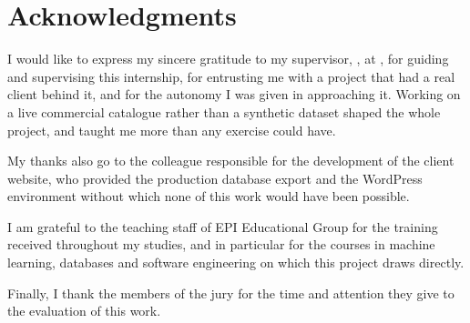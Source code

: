 \thispagestyle{plain}
{}
\chapter*{Acknowledgments}

I would like to express my sincere gratitude to my supervisor, \supervisor, at \companyname, for guiding and supervising this internship, for entrusting me with a project that had a real client behind it, and for the autonomy I was given in approaching it. Working on a live commercial catalogue rather than a synthetic dataset shaped the whole project, and taught me more than any exercise could have.

My thanks also go to the colleague responsible for the development of the
client website, who provided the production database export and the WordPress
environment without which none of this work would have been possible.

I am grateful to the teaching staff of EPI Educational Group for the training
received throughout my studies, and in particular for the courses in machine
learning, databases and software engineering on which this project draws
directly.

Finally, I thank the members of the jury for the time and attention they give
to the evaluation of this work.

\clearpage
